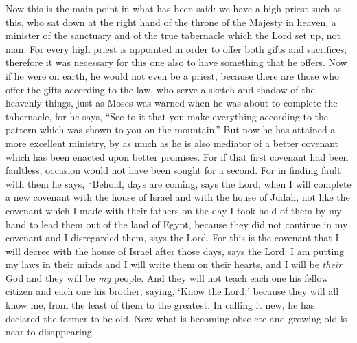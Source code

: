 \begin{biblechapter} %
 Now this is the main point in what has been said: we have a high priest such as this, who sat down at the right hand of the throne of the Majesty in heaven,
\verse a minister of the sanctuary and of the true tabernacle which the Lord set up, not man.
\verse For every high priest is appointed in order to offer both gifts and sacrifices; therefore it was necessary for this one also to have something that he offers.
\verse Now if he were on earth, he would not even be a priest, because there are those who offer the gifts according to the law,
\verse who serve a sketch and shadow of the heavenly things, just as Moses was warned when he was about to complete the tabernacle, for he says, “See to it that you make everything according to the pattern which was shown to you on the mountain.”
\verse But now he has attained a more excellent ministry, by as much as he is also mediator of a better covenant which has been enacted upon better promises.
\verse For if that first covenant had been faultless, occasion would not have been sought for a second.
\verse For in finding fault with them he says,
\verse “Behold, days are coming, says the Lord, 
when I will complete a new covenant with the house of Israel 
and with the house of Judah,
\verse not like the covenant which I made with their fathers 
on the day I took hold of them by my hand 
to lead them out of the land of Egypt, 
because they did not continue in my covenant 
and I disregarded them, says the Lord.
\verse For this is the covenant that I will decree with the house of Israel 
after those days, says the Lord: 
I am putting my laws in their minds 
and I will write them on their hearts, 
and I will be \textit{their} God 
and they will be \textit{my} people.
\verse And they will not teach each one his fellow citizen 
and each one his brother, saying, ‘Know the Lord,’ 
because they will all know me, 
from the least of them to the greatest.
\verse In calling it new, he has declared the former to be old. Now what is becoming obsolete and growing old is near to disappearing.
\end{biblechapter}

